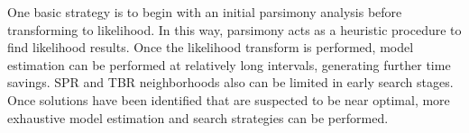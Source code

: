 One basic strategy is to begin with an initial parsimony analysis before transforming to likelihood.  In this way, 
parsimony acts as a heuristic procedure to find likelihood results.  Once the likelihood transform is performed, model estimation can
be performed at relatively long intervals, generating further time savings.  SPR and TBR neighborhoods also can be limited in
early search stages.  Once solutions have been identified that are suspected to be near
optimal, more exhaustive model estimation and search strategies can be performed.
